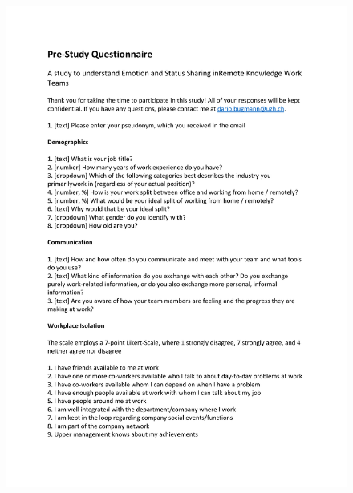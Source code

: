 \begin{figure}[h]
    \centering
    \includegraphics[width=\linewidth, page=1]{./documents/Prestudy_Questionnaire.pdf}
\end{figure}

